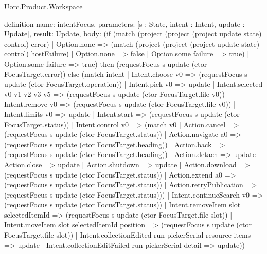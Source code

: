 \begin{lexlean}{Uorc.Product.Workspace}
\begin{semanticmodule}
definition{
  name: intentFocus,
  parameters: [s : State, intent : Intent, update : Update],
  result: Update,
  body: (if (match (project (project (project update state) control) error)
    | Option.none => (match (project (project (project update state) control) hostFailure)
      | Option.none => false
      | Option.some failure => true)
    | Option.some failure => true) then (requestFocus s update (ctor FocusTarget.error)) else (match intent
    | Intent.choose v0 => (requestFocus s update (ctor FocusTarget.operation))
    | Intent.pick v0 => update
    | Intent.selected v0 v1 v2 v3 v5 => (requestFocus s update (ctor FocusTarget.file v0))
    | Intent.remove v0 => (requestFocus s update (ctor FocusTarget.file v0))
    | Intent.limits v0 => update
    | Intent.start => (requestFocus s update (ctor FocusTarget.status))
    | Intent.control v0 => (match v0
      | Action.cancel => (requestFocus s update (ctor FocusTarget.status))
      | Action.navigate a0 => (requestFocus s update (ctor FocusTarget.heading))
      | Action.back => (requestFocus s update (ctor FocusTarget.heading))
      | Action.detach => update
      | Action.close => update
      | Action.shutdown => update
      | Action.download => (requestFocus s update (ctor FocusTarget.status))
      | Action.extend a0 => (requestFocus s update (ctor FocusTarget.status))
      | Action.retryPublication => (requestFocus s update (ctor FocusTarget.status)))
    | Intent.continueSearch v0 => (requestFocus s update (ctor FocusTarget.status))
    | Intent.removeItem slot selectedItemId => (requestFocus s update (ctor FocusTarget.file slot))
    | Intent.moveItem slot selectedItemId position => (requestFocus s update (ctor FocusTarget.file slot))
    | Intent.collectionEdited run pickerSerial resource items => update
    | Intent.collectionEditFailed run pickerSerial detail => update))
}


\end{semanticmodule}
\end{lexlean}
